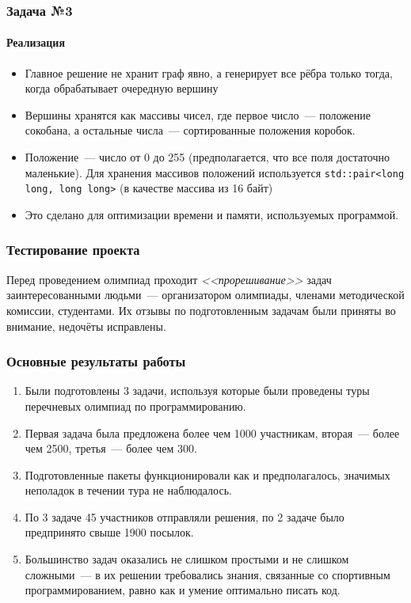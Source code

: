 \documentclass{beamer}
\begin{document}
\begin{frame}
\frametitle{Задача №3}
\framesubtitle{Реализация}
\begin{itemize}
\item Главное решение не хранит граф явно, а генерирует все рёбра только тогда, когда обрабатывает очередную вершину
\item Вершины хранятся как массивы чисел, где первое число~--- положение сокобана, а остальные числа~--- сортированные положения коробок.
\item Положение~--- число от 0 до 255 (предполагается, что все поля достаточно маленькие). Для хранения массивов положений используется \texttt{std::pair<long long, long long>} (в качестве массива из 16 байт)
\item Это сделано для оптимизации времени и памяти, используемых программой.
\end{itemize}
\end{frame}








\begin{frame}
\frametitle{Тестирование проекта}
Перед проведением олимпиад проходит \emph{ <<прорешивание>> } задач заинтересованными людьми~--- организатором олимпиады, членами методической комиссии, студентами. Их отзывы по подготовленным задачам были приняты во внимание, недочёты исправлены.
\end{frame}








\begin{frame}
\fontsize{11pt}{7.2}\selectfont
\frametitle{Основные результаты работы}
\begin{enumerate}
\item Были подготовлены 3 задачи, используя которые были проведены туры перечневых олимпиад по программированию.
\item Первая задача была предложена более чем 1000 участникам, вторая~--- более чем 2500, третья~--- более чем 300.
\item Подготовленные пакеты функционировали как и предполагалось, значимых неполадок в течении тура не наблюдалось.
\item По 3 задаче 45 участников отправляли решения, по 2 задаче было предпринято свыше 1900 посылок.
\item Большинство задач оказались не слишком простыми и не слишком сложными~--- в их решении требовались знания, связанные со спортивным программированием, равно как и умение оптимально писать код. 
\end{enumerate}
\end{frame}
\end{document}
